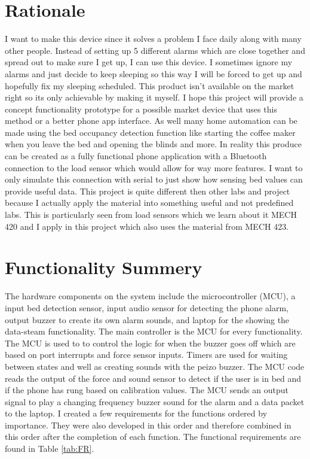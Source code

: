 \documentclass[11pt]{article}
\begin{document}
\section{Rationale}
I want to make this device since it solves a problem I face daily along with many other people.
Instead of setting up 5 different alarms which are close together and spread out to make sure I get up, I can use this device.
I sometimes ignore my alarms and just decide to keep sleeping so this way I will be forced to get up and hopefully fix my sleeping scheduled.
This product isn't available on the market right so its only achievable by making it myself.
I hope this project will provide a concept functionality prototype for a possible market device that uses this method or a better phone app interface. 
As well many home automation can be made using the bed occupancy detection function like starting the coffee maker when you leave the bed and opening the blinds and more.
In reality this produce can be created as a fully functional phone application with a Bluetooth connection to the load sensor which would allow for way more features.
I want to only simulate this connection with serial to just show how sensing bed values can provide useful data.
This project is quite different then other labs and project because I actually apply the material into something useful and not predefined labs.
This is particularly seen from load sensors which we learn about it MECH 420 and I apply in this project which also uses the material from MECH 423. 

\section{Functionality Summery}
The hardware components on the system include the microcontroller (MCU), a input bed detection sensor, input audio sensor for detecting the phone alarm, output buzzer to create its own alarm sounds, and laptop for the showing the data-steam functionality. 
The main controller is the MCU for every functionality.
The MCU is used to to control the logic for when the buzzer goes off which are based on port interrupts and force sensor inputs. 
Timers are used for waiting between states and well as creating sounds with the peizo buzzer.
The MCU code reads the output of the force and sound sensor to detect if the user is in bed and if the phone has rung based on calibration values.
The MCU sends an output signal to play a changing frequency buzzer sound for the alarm and a data packet to the laptop. 
I created a few requirements for the functions ordered by importance.
They were also developed in this order and therefore combined in this order after the completion of each function.
The functional requirements are found in Table \ref{tab:FR}.\\
\end{document}
